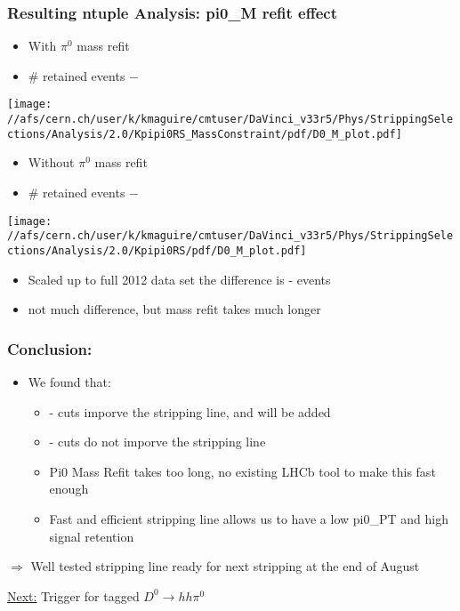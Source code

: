 \documentclass[10pt,a4paper]{beamer}
\begin{document}
\begin{frame}
\frametitle{Resulting ntuple Analysis: pi0\_M refit effect}
\begin{minipage}{5.25cm}
\begin{itemize}
\item{With $\pi^{0}$ mass refit}
\item{\# retained events $-$}
\end{itemize}
\texttt{[image: //afs/cern.ch/user/k/kmaguire/cmtuser/DaVinci\_v33r5/Phys/StrippingSelections/Analysis/2.0/Kpipi0RS\_MassConstraint/pdf/D0\_M\_plot.pdf]}
\end{minipage}
\hspace{2.0em}
\begin{minipage}{5.25cm}
\begin{itemize}
\item{Without $\pi^{0}$ mass refit}
\item{\# retained events $-$}
\end{itemize}
\texttt{[image: //afs/cern.ch/user/k/kmaguire/cmtuser/DaVinci\_v33r5/Phys/StrippingSelections/Analysis/2.0/Kpipi0RS/pdf/D0\_M\_plot.pdf]}
\end{minipage}
\begin{itemize}
\item{Scaled up to full 2012 data set the difference is - events}
\item{not much difference, but mass refit takes much longer}
\end{itemize}
\end{frame}

\begin{frame}
\frametitle{Conclusion:}
\begin{itemize}
\item{We found that:}
\begin{itemize}
\item{ - cuts imporve the stripping line, and will be added}
\item{ - cuts do not imporve the stripping line}
\item{Pi0 Mass Refit takes too long, no existing LHCb tool to make this fast enough}
\item{Fast and efficient stripping line allows us to have a low pi0\_PT and high signal retention}
\end{itemize}
\end{itemize}
\hspace{3.0em}
\item{$\Rightarrow$ Well tested stripping line ready for next stripping at the end of August}
\vspace{3.0em}
\hspace{1.0em} \item{\underline{Next:} Trigger for tagged $D^{0} \rightarrow h h \pi^{0}$}
\end{frame}
\end{document}
